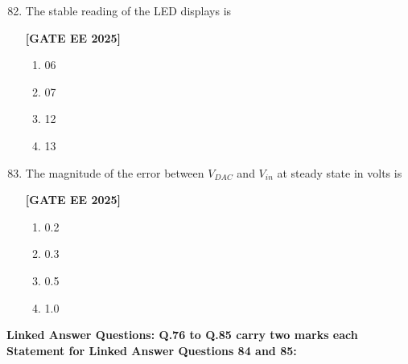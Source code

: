 \documentclass[12pt]{article}
\begin{document}
\begin{enumerate}[leftmargin=*, label=\textbf{Q.\arabic*:}]
\setcounter{enumi}{81}

\item The stable reading of the LED displays is
 
\noindent \textbf{[GATE EE 2025]}
\begin{multicols}{4}
\begin{enumerate}
  \item 06
  \item 07
  \item 12
  \item 13
\end{enumerate}
\end{multicols}

\item The magnitude of the error between $V_{DAC}$ and $V_{in}$ at steady state in volts is
 
\noindent \textbf{[GATE EE 2025]}
\begin{multicols}{4}
\begin{enumerate}
  \item 0.2
  \item 0.3
  \item 0.5
  \item 1.0
\end{enumerate}
\end{multicols}

\end{enumerate}


 \large \textbf {Linked Answer Questions: Q.76 to Q.85 carry two marks each}
 \large \textbf {Statement for Linked Answer Questions 84 and 85: }
\end{document}
